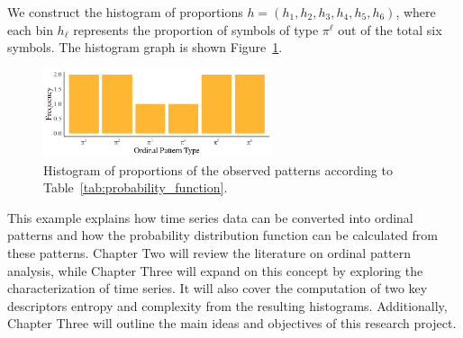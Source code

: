 We construct the histogram of proportions $h=(h_1,h_2,h_3,h_4,h_5,h_6)$, where each bin $h_\ell$ represents the proportion of symbols of type $\pi^\ell$ out of the total six symbols. The histogram graph is shown Figure~\ref{fig:histogram}.

\begin{figure}[hbt]
	\centering
	\includegraphics[width=0.6\textwidth]{frequency histogram}
	\caption{Histogram of proportions of the observed patterns according to Table~\ref{tab:probability_function}.}
	\label{fig:histogram}
\end{figure}

This example explains how time series data can be converted into ordinal patterns and how the probability distribution function can be calculated from these patterns. Chapter Two will review the literature on ordinal pattern analysis, while Chapter Three will expand on this concept by exploring the characterization of time series. It will also cover the computation of two key descriptors entropy and complexity from the resulting histograms. Additionally, Chapter Three will outline the main ideas and objectives of this research project.      






